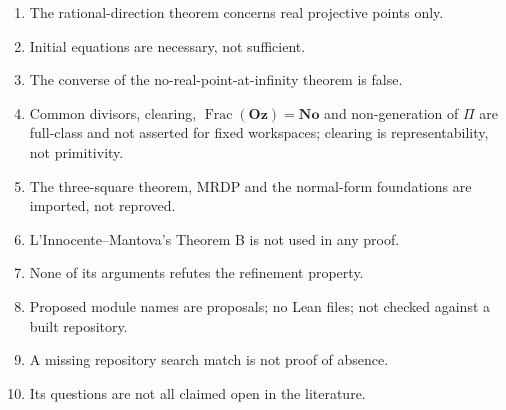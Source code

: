 \documentclass[11pt,oneside]{article}
\numberwithin{equation}{section}
\theoremstyle{definition}
\theoremstyle{remark}
\newcommand{\No}{\mathbf{No}}
\newcommand{\Oz}{\mathbf{Oz}}
\newcommand{\Frac}{\operatorname{Frac}}
\begin{document}
\begin{enumerate}[leftmargin=*,itemsep=1pt]
Fermat problem.
\item The rational-direction theorem concerns real projective points only.
\item Initial equations are necessary, not sufficient.
\item The converse of the no-real-point-at-infinity theorem is false.
\item Common divisors, clearing, $\Frac(\Oz)=\No$ and non-generation of $\Pi$
are full-class and not asserted for fixed workspaces; clearing is
representability, not primitivity.
\item The three-square theorem, MRDP and the normal-form foundations are
imported, not reproved.
\item L'Innocente--Mantova's Theorem B is not used in any proof.
\item None of its arguments refutes the refinement property.
\item Proposed module names are proposals; no Lean files; not checked against
a built repository.
\item A missing repository search match is not proof of absence.
\item Its questions are not all claimed open in the literature.
\end{enumerate}
\end{document}
